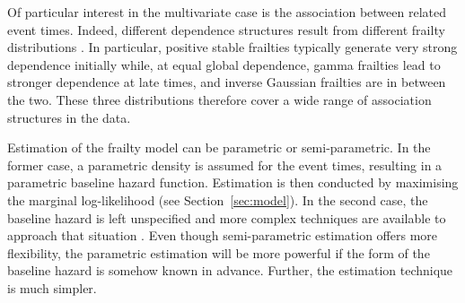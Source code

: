 Of particular interest in the multivariate case is the association between related event times.
Indeed, different dependence structures result from different frailty distributions \citep{Hougaard95}.
In particular, positive stable frailties typically generate very strong dependence initially while, at equal global dependence,
gamma frailties lead to stronger dependence at late times, and inverse Gaussian frailties 
  are in between the two.  
These three distributions therefore cover a wide range of association structures in the data.

Estimation of the frailty model can be parametric or semi-parametric. 
In the former case, a parametric density is assumed for the event times, 
  resulting in a parametric baseline hazard function.
Estimation is then conducted by maximising the marginal log-likelihood (see Section~\ref{sec:model}).
In the second case, the baseline hazard is left unspecified and more complex techniques are available to
  approach that situation \citep{AbrahantesEtal07}.
Even though semi-parametric estimation offers more flexibility,
  the parametric estimation will be more powerful if the form of the baseline hazard is somehow known in advance.
Further, the estimation technique is much simpler.


